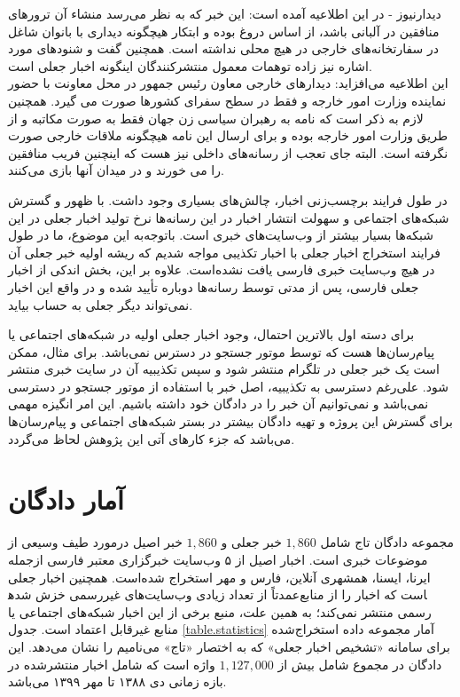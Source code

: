\begin{enumerate}
دیدارنیوز - در این اطلاعیه آمده است: این خبر که به نظر می‌رسد منشاء آن ترور‌های منافقین در آلبانی باشد، از اساس دروغ بوده و ابتکار هیچگونه دیداری با بانوان شاغل در سفارتخانه‌های خارجی در هیچ محلی نداشته است. همچنین گفت و شنودهای مورد اشاره نیز زاده توهمات معمول منتشرکنندگان اینگونه اخبار جعلی است. 
\\
این اطلاعیه می‌افزاید: دیدارهای خارجی معاون رئیس جمهور در محل معاونت با حضور نماینده وزارت امور خارجه و فقط در سطح سفرای کشورها صورت می گیرد. همچنین لازم به ذکر است که نامه به رهبران سیاسی زن جهان فقط به صورت مکاتبه و از طریق وزارت امور خارجه بوده و برای ارسال این نامه هیچگونه ملاقات خارجی صورت نگرفته است. البته جای تعجب از رسانه‌های داخلی نیز هست که اینچنین فریب منافقین را می خورند و در میدان آنها بازی می‌کنند.
\end{enumerate}



در طول فرایند برچسب‌زنی اخبار، چالش‌های بسیاری وجود داشت. با ظهور و گسترش شبکه‌های اجتماعی و سهولت انتشار اخبار در این رسانه‌ها نرخ تولید اخبار جعلی در این شبکه‌ها بسیار بیشتر از وب‌سایت‌های خبری است. باتوجه‌به این موضوع، ما در طول فرایند استخراج اخبار جعلی با اخبار تکذیبی مواجه شدیم که ریشه اولیه خبر جعلی آن در هیچ وب‌سایت خبری فارسی یافت نشده‌است. علاوه بر این، بخش اندکی از اخبار جعلی فارسی، پس از مدتی توسط رسانه‌ها دوباره تأیید شده و در واقع این اخبار نمی‌تواند دیگر جعلی به حساب بیاید.

برای دسته اول بالاترین احتمال، وجود اخبار جعلی اولیه در شبکه‌های اجتماعی یا پیام‌رسان‌ها هست که توسط موتور جستجو در دسترس نمی‌باشد. برای مثال، ممکن است یک خبر جعلی در تلگرام منتشر شود و سپس تکذیبیه آن در سایت خبری منتشر شود. علی‌رغم دسترسی به تکذیبیه، اصل خبر با استفاده از موتور جستجو در دسترسی نمی‌باشد و نمی‌توانیم آن خبر را در دادگان خود داشته باشیم. این امر انگیزه مهمی برای گسترش این پروژه و تهیه دادگان بیشتر در بستر شبکه‌های اجتماعی و پیام‌رسان‌ها می‌باشد که جزء کارهای آتی این پژوهش لحاظ می‌گردد.
\section{آمار دادگان}
مجموعه دادگان تاج شامل $1,860$ خبر جعلی و $1,860$ خبر اصیل درمورد طیف وسیعی از موضوعات خبری است. اخبار اصیل از ۵ وب‌سایت خبرگزاری معتبر فارسی ازجمله ایرنا، ایسنا، همشهری آنلاین، فارس و مهر استخراج شده‌است. همچنین اخبار جعلی عمدتاً از تعداد زیادی وب‌سایت‌های غیررسمی خزش‌ شده‎است که اخبار را از منابع رسمی منتشر نمی‌کند؛ به همین علت، منبع برخی از این اخبار شبکه‌های اجتماعی یا منابع غیرقابل اعتماد است. جدول \ref{table.statistics} آمار مجموعه داده استخراج‌شده برای سامانه «تشخیص اخبار جعلی» که به اختصار «تاج» می‌نامیم  را نشان می‌دهد. این دادگان در مجموع شامل بیش از $1,127,000$ واژه است که  شامل اخبار منتشرشده در بازه زمانی دی ۱۳۸۸ تا مهر ۱۳۹۹ می‌باشد. 

